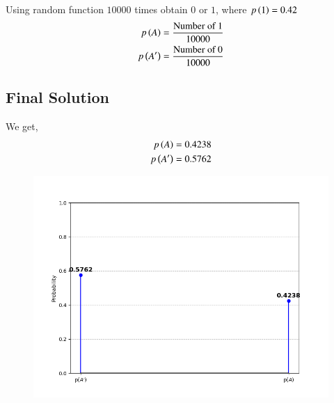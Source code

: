 \documentclass[journal]{IEEEtran}
\begin{document}
Using random function $10000$ times obtain $0$ or $1$, where $p\left(1\right)=0.42$ 
\begin{align}
    p\left(A\right)=\frac{\text{Number of 1}}{10000}\\
        p\left(A'\right)=\frac{\text{Number of 0}}{10000}
\end{align}

	\subsection*{Final Solution}
	We get,
    \begin{align}
        p\left(A\right)=0.4238 \\
        p\left(A'\right)=0.5762
    \end{align}

\begin{figure}[h]
    \centering
    \includegraphics[width=\columnwidth]{figs/Figure_1.png}
    \label{fig:Plot}
    \end{figure}
\end{document}
